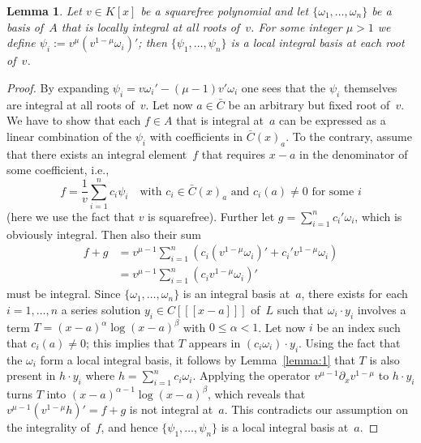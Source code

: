 \documentclass{sig-alternate}
\newtheorem{lemma}[theorem]{Lemma}
\begin{document}
\begin{lemma}\label{lemma:ibv}
Let $v\in K[x]$ be a squarefree polynomial and let $\{\omega_1,\ldots,\omega_n\}$
be a basis of~$A$ that is locally integral at all roots of~$v$.
For some integer $\mu>1$ we define $\psi_i:=v^\mu\left(v^{1-\mu}\omega_i\right)'$; then
$\{\psi_1,\ldots,\psi_n\}$ is a local integral basis at each root of~$v$.
\end{lemma}
\begin{proof}
By expanding $\psi_i=v\omega_i'-(\mu-1)v'\omega_i$ one sees that the $\psi_i$
themselves are integral at all roots of~$v$. Let now $a\in\bar{C}$ be an
arbitrary but fixed root of~$v$. We have to show that each $f\in A$ that is
integral at~$a$ can be expressed as a linear combination of the $\psi_i$ with
coefficients in $\bar C(x)_a$. To the contrary, assume that there exists an
integral element~$f$ that requires $x-a$ in the denominator of some
coefficient, i.e.,
\[
  f = \frac{1}{v} \sum_{i=1}^n c_i \psi_i \quad\text{with }c_i\in \bar{C}(x)_a
  \text{ and } c_i(a)\neq0 \text{ for some } i
\]
(here we use the fact that $v$ is squarefree).  Further let $g=\sum_{i=1}^n
c_i'\omega_i$, which is obviously integral. Then also their sum
\begin{align*}
  f+g &= v^{\mu-1} \sum_{i=1}^n \left(c_i\left(v^{1-\mu}\omega_i\right)'
  + c_i'v^{1-\mu}\omega_i \right) \\
  &= v^{\mu-1} \sum_{i=1}^n \left(c_iv^{1-\mu}\omega_i\right)'
\end{align*}
must be integral. Since $\{\omega_1,\ldots,\omega_n\}$ is an integral basis at~$a$,
there exists for each $i=1,\ldots,n$ a series solution $y_i\in C[[[x-a]]]$
of~$L$ such that $\omega_i\cdot y_i$ involves a term
$T=(x-a)^\alpha\log(x-a)^\beta$ with $0\leq\alpha<1$.
Let now $i$ be an index such that $c_i(a)\neq0$;
this implies that $T$ appears in $(c_i\omega_i)\cdot y_i$.
Using the fact that the $\omega_i$ form a local integral basis, it follows by
Lemma~\ref{lemma:1} that $T$ is also present in $h\cdot y_i$ where
$h=\sum_{i=1}^n c_i\omega_i$. Applying the operator $v^{\mu-1}\partial_xv^{1-\mu}$
to $h\cdot y_i$ turns $T$ into $(x-a)^{\alpha-1}\log(x-a)^\beta$, which reveals that
$v^{\mu-1}(v^{1-\mu}h)'=f+g$ is not integral at~$a$. This contradicts our assumption on
the integrality of~$f$, and hence $\{\psi_1,\ldots,\psi_n\}$ is a local integral
basis at~$a$.
\end{proof}
\end{document}
